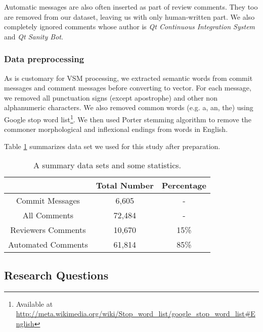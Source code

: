 Automatic messages are also often inserted as part of review comments.
They too are removed from our dataset, leaving us with only human-written part.
We also completely ignored comments whose author is \emph{Qt Continuous Integration System} and \emph{Qt Sanity Bot}.

\subsubsection{Data preprocessing}
As is customary for VSM processing, we extracted semantic words from commit messages and comment messages before converting to vector.
For each message, we removed all punctuation signs (except apostrophe) and other non alphanumeric characters. We also removed common words (e.g. a, an, the) using Google stop word list\footnote{Available at \url{http://meta.wikimedia.org/wiki/Stop_word_list/google_stop_word_list#English}}. We then used Porter stemming algorithm to remove the commoner morphological and inflexional endings from words in English.

Table \ref{tb:datastatistic} summarizes data set we used for this study after preparation. 

\begin{table}[!h]
\caption{A summary data sets and some statistics.}
\centering
\small
\begin{tabular}{ccc}
\hline
& Total Number & Percentage \\ \hline \hline
Commit Messages & 6,605 &  -  \\ \hline
All Comments & 72,484& - \\ \hline
Reviewers Comments & 10,670 & 15\% \\ \hline
Automated Comments & 61,814 & 85\% \\ \hline 

\end{tabular}
\label{tb:datastatistic}
\end{table}


\subsection{Research Questions}

